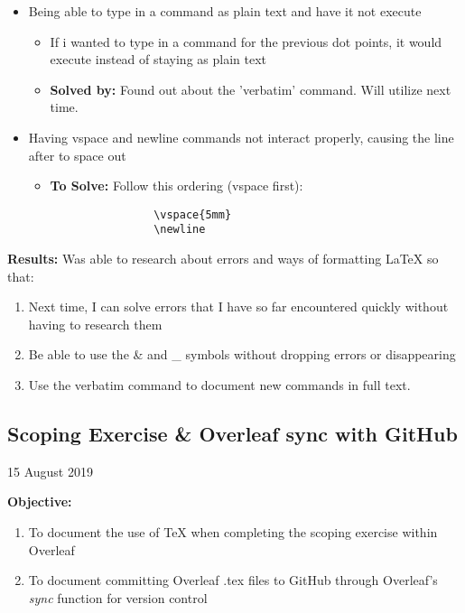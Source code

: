 \documentclass{article}
\begin{document}
\begin{itemize}
\begin{itemize}
        \item \textbf{Solved by:} checking where I have incorrectly used a double backslash or newline. Error went away
    \end{itemize}
    \item Being able to type in a command as plain text and have it not execute
        \begin{itemize}
            \item If i wanted to type in a command for the previous dot points, it would execute instead of staying as plain text
            \item \textbf{Solved by:} Found out about the 'verbatim' command. Will utilize next time.
        \end{itemize}
    \item Having vspace and newline commands not interact properly, causing the line after to space out
        \begin{itemize}
            \item \textbf{To Solve:} Follow this ordering (vspace first):
            \begin{verbatim}
                \vspace{5mm}
                \newline
            \end{verbatim}
        \end{itemize}
\end{itemize}
\textbf{Results:} Was able to research about errors and ways of formatting LaTeX so that:
\begin{enumerate}
    \item Next time, I can solve errors that I have so far encountered quickly without having to research them
    \item Be able to use the \& and \_ symbols without dropping errors or disappearing
    \item Use the verbatim command to document new commands in full text.
\end{enumerate}
\newpage
\begin{center}
\section{Scoping Exercise \& Overleaf sync with GitHub}
15 August 2019
\end{center}
\textbf{Objective:}
\begin{enumerate}
    \item To document the use of TeX when completing the scoping exercise within Overleaf
    \item To document committing Overleaf .tex files to GitHub through Overleaf's \textit{sync} function for version control
\end{enumerate}
\end{document}
